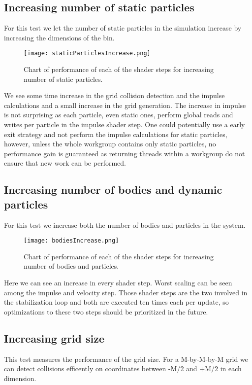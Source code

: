 \subsection{Increasing number of static particles}
For this test we let the number of static particles in the simulation increase
by increasing the dimensions of the bin.

\begin{figure}[H]
  \centering
  \texttt{[image: staticParticlesIncrease.png]}
  \caption{Chart of performance of each of the shader steps for increasing number of static particles.}
\end{figure}

We see some time increase in the grid collision detection and the impulse calculations
and a small increase in the grid generation.
The increase in impulse is not surprising as each particle, even static ones, perform
global reads and writes per particle in the impulse shader step. One could potentially
use a early exit strategy and not perform the impulse calculations for static particles,
however, unless the whole workgroup contains only static particles, no performance
gain is guaranteed as returning threads within a workgroup do not ensure
that new work can be performed.

\subsection{Increasing number of bodies and dynamic particles}
For this test we increase both the number of bodies and particles in the system.
\begin{figure}[H]
  \centering
  \texttt{[image: bodiesIncrease.png]}
  \caption{Chart of performance of each of the shader steps for increasing number of bodies and particles.}
\end{figure}

Here we can see an increase in every shader step.
Worst scaling can be seen among the impulse and velocity step. Those shader steps are the two involved
in the stabilization loop and both are executed ten times each per update, so optimizations
to these two steps should be prioritized in the future.

\subsection{Increasing grid size}
This test measures the performance of the grid size. For a M-by-M-by-M grid we can detect collisions
efficently on coordinates between -M/2 and +M/2 in each dimension.

